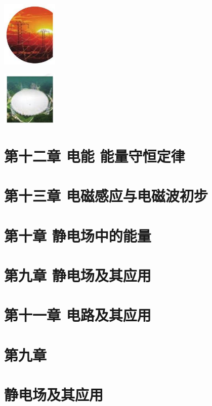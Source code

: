 \documentclass[10pt]{article}
\begin{document}
\begin{center}
\includegraphics[max width=0.2\textwidth]{images/01911d5f-8e38-70c0-b5b8-2b399bd115b6_4_548624.jpg}
\end{center}

\begin{center}
\includegraphics[max width=0.2\textwidth]{images/01911d5f-8e38-70c0-b5b8-2b399bd115b6_4_739819.jpg}
\end{center}

\section*{第十二章 电能 能量守恒定律}

\section*{第十三章 电磁感应与电磁波初步}

\section*{第十章 静电场中的能量}

\section*{第九章 静电场及其应用}

\section*{第十一章 电路及其应用}

\section*{第九章}

\section*{静电场及其应用}
\end{document}

